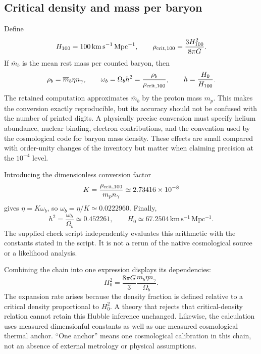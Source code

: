 \subsection{Critical density and mass per baryon}
Define
\begin{equation}
 H_{100}=100\,\mathrm{km\,s^{-1}\,Mpc^{-1}},\qquad
 \rho_{\rm crit,100}=\frac{3H_{100}^2}{8\pi G}.
 \label{c8:critical}
\end{equation}
If $\overline m_b$ is the mean rest mass per counted baryon, then
\begin{equation}
 \rho_b=\overline m_b\eta n_\gamma,\qquad
 \omega_b=\Omega_bh^2=\frac{\rho_b}{\rho_{\rm crit,100}},
 \qquad h=\frac{H_0}{H_{100}}.
 \label{c8:physicalbaryon}
\end{equation}
The retained computation approximates $\overline m_b$ by the proton mass $m_p$. This makes the conversion exactly reproducible, but its accuracy should not be confused with the number of printed digits. A physically precise conversion must specify helium abundance, nuclear binding, electron contributions, and the convention used by the cosmological code for baryon mass density. These effects are small compared with order-unity changes of the inventory but matter when claiming precision at the $10^{-4}$ level.

Introducing the dimensionless conversion factor
\begin{equation}
 K=\frac{\rho_{\rm crit,100}}{m_pn_\gamma}
 \simeq2.73416\times10^{-8}
 \label{c8:K}
\end{equation}
gives $\eta=K\omega_b$, so $\omega_b=\eta/K\simeq0.0222960$. Finally,
\begin{equation}
 h^2=\frac{\omega_b}{\Omega_b}\simeq0.452261,
 \qquad H_0\simeq67.2504\,\mathrm{km\,s^{-1}\,Mpc^{-1}}.
 \label{c8:hubble}
\end{equation}
The supplied check script independently evaluates this arithmetic with the constants stated in the script. It is not a rerun of the native cosmological source or a likelihood analysis.

Combining the chain into one expression displays its dependencies:
\begin{equation}
 H_0^2=\frac{8\pi G}{3}
 \frac{\overline m_b\eta n_\gamma}{\Omega_b}.
 \label{c8:directH}
\end{equation}
The expansion rate arises because the density fraction is defined relative to a critical density proportional to $H_0^2$. A theory that rejects that critical-density relation cannot retain this Hubble inference unchanged. Likewise, the calculation uses measured dimensionful constants as well as one measured cosmological thermal anchor. ``One anchor'' means one cosmological calibration in this chain, not an absence of external metrology or physical assumptions.

